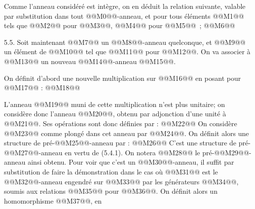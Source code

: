 

Comme l'anneau considéré est intègre, on en déduit la relation suivante, valable par substitution dans tout @@M0@@-anneau, et pour tous éléments @@M1@@ tels que @@M2@@ pour @@M3@@, @@M4@@ pour @@M5@@~;
@@M6@@


5.5. Soit maintenant @@M7@@ un @@M8@@-anneau quelconque, et @@M9@@ un élément de @@M10@@ tel que @@M11@@ pour @@M12@@. On va associer à @@M13@@ un nouveau @@M14@@-anneau @@M15@@.

On définit d'abord une nouvelle multiplication sur @@M16@@ en posant pour @@M17@@ :
@@M18@@

L'anneau @@M19@@ muni de cette multiplication n'est plus unitaire; on considère donc l'anneau @@M20@@, obtenu par adjonction d'une unité à @@M21@@. Ses opérations sont donc définies par :
@@M22@@
On considère @@M23@@ comme plongé dans cet anneau par @@M24@@. On définit alors une structure de pré-@@M25@@-anneau par :
@@M26@@
C'est une structure de pré-@@M27@@-anneau en vertu de (5.4.1). On notera @@M28@@ le pré-@@M29@@-anneau ainsi obtenu. Pour voir que c'est un @@M30@@-anneau, il suffit par substitution de faire la démonstration dans le cas où @@M31@@ est le @@M32@@-anneau engendré sur @@M33@@ par les générateurs @@M34@@, soumis aux relations @@M35@@ pour @@M36@@. On définit alors un homomorphisme @@M37@@, en
